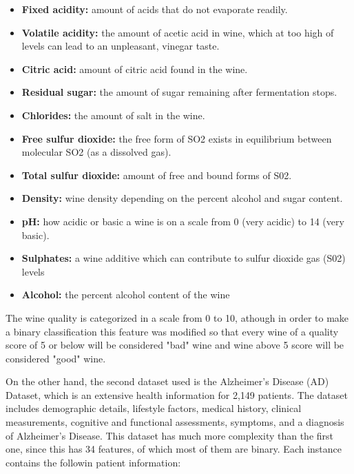 \documentclass[conference]{IEEEtran}
\begin{document}
    \begin{itemize}
    \item \textbf{Fixed acidity:} amount of acids that do not evaporate readily.
    \item \textbf{Volatile acidity:}  the amount of acetic acid in wine, which at too high of levels can lead to an unpleasant, vinegar taste.
    \item \textbf{Citric acid:} amount of citric acid found in the wine.
    \item \textbf{Residual sugar:} the amount of sugar remaining after fermentation stops.
    \item \textbf{Chlorides:} the amount of salt in the wine.
    \item \textbf{Free sulfur dioxide:} the free form of SO2 exists in equilibrium between molecular SO2 (as a dissolved gas).
    \item \textbf{Total sulfur dioxide:} amount of free and bound forms of S02.
    \item \textbf{Density:} wine density depending on the percent alcohol and sugar content.
    \item \textbf{pH:}  how acidic or basic a wine is on a scale from 0 (very acidic) to 14 (very basic).
    \item \textbf{Sulphates:} a wine additive which can contribute to sulfur dioxide gas (S02) levels
    \item \textbf{Alcohol:} the percent alcohol content of the wine
    \end{itemize}
    
The wine quality is categorized in a scale from 0 to 10, athough in order to make a binary classification this feature was modified so that every wine of a quality score of 5 or below will be considered "bad" wine and wine above 5 score will be considered "good" wine.

On the other hand, the second dataset used is the Alzheimer's Disease (AD) Dataset, which is an extensive health information for 2,149 patients. The dataset includes demographic details, lifestyle factors, medical history, clinical measurements, cognitive and functional assessments, symptoms, and a diagnosis of Alzheimer's Disease. This dataset has much more complexity than the first one, since this has 34 features, of which most of them are binary. Each instance contains the followin patient information:
\end{document}
